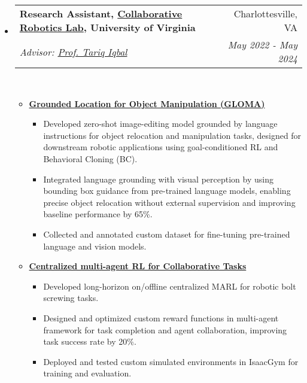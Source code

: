 \documentclass[letterpaper,11pt]{article}
\makeatletter
\newcommand{\Date}[1]{\textit{\small #1}}
\newcommand{\resumeSubheading}[4]{
  \item
    \begin{tabular*}{0.9798\textwidth}{l@{\extracolsep{\fill}}r} %
      \textbf{#1} & #2 \\
      \textit{\small#3} & \Date{#4} \\
    \end{tabular*}\
}
\makeatother
\begin{document}
\begin{itemize}
  \resumeSubheading{Research Assistant, \href{https://www.collabrobotics.com/}{Collaborative Robotics Lab}, University of Virginia}{Charlottesville, VA}
  {Advisor: \href{https://www.tiqbal.com/}{Prof. Tariq Iqbal}}{May 2022 - May 2024}
  \begin{itemize}
    \item \href{https://github.com/branyang02/GLOMA}{\textbf{Grounded Location for Object Manipulation (GLOMA)}}
          \begin{itemize}
            \item Developed zero-shot image-editing model grounded by language instructions for object relocation and manipulation tasks, designed for downstream robotic applications using goal-conditioned RL and Behavioral Cloning (BC).
            \item Integrated language grounding with visual perception by using bounding box guidance from pre-trained language models, enabling precise object relocation without external supervision and improving baseline performance by 65\%.
            \item Collected and annotated custom dataset for fine-tuning pre-trained language and vision models.
          \end{itemize}
    \item \textbf{\href{https://github.com/branyang02/PandaFactory}{Centralized multi-agent RL for Collaborative Tasks}}
          \begin{itemize}
            \item Developed long-horizon on/offline centralized MARL for robotic bolt screwing tasks.
            \item Designed and optimized custom reward functions in multi-agent framework for task completion and agent collaboration, improving task success rate by 20\%.
            \item Deployed and tested custom simulated environments in IsaacGym for training and evaluation.
          \end{itemize}
  \end{itemize}
\end{itemize}
\end{document}
